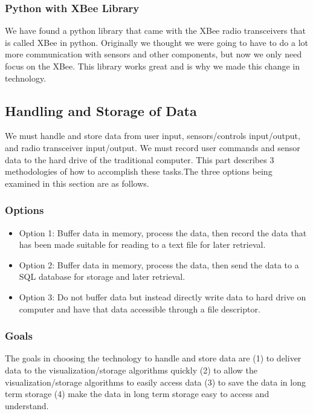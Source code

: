 \documentclass[10pt,draftclsnofoot,onecolumn]{IEEEtran}
\begin{document}
\subsubsection{Python with XBee Library}
We have found a python library that came with the XBee radio transceivers that is called XBee in python. Originally we thought we were going to have to do a lot more communication with sensors and other components, but now we only need focus on the XBee. This library works great and is why we made this change in technology.

\subsection{Handling and Storage of Data}
We must handle and store data from user input, sensors/controls input/output, and radio transceiver input/output.  We must record user commands and sensor data to the hard drive of the traditional computer. This part describes 3 methodologies of how to accomplish these tasks.The three options being examined in this section are as follows. \\
\subsubsection{Options}
	\begin{itemize}
	\item Option 1: Buffer data in memory, process the data, then record the data that has been made suitable for reading to a text file for later retrieval.
	\item Option 2: Buffer data in memory, process the data, then send the data to a SQL database for storage and later retrieval.
	\item Option 3: Do not buffer data but instead directly write data to hard drive on computer and have that data accessible through a file descriptor.\\
	\end{itemize}
\subsubsection{Goals}
The goals in choosing the technology to handle and store data are (1) to deliver data to the visualization/storage algorithms quickly (2) to allow the visualization/storage algorithms to easily access data (3) to save the data in long term storage (4) make the data in long term storage easy to access and understand.\\
\end{document}
